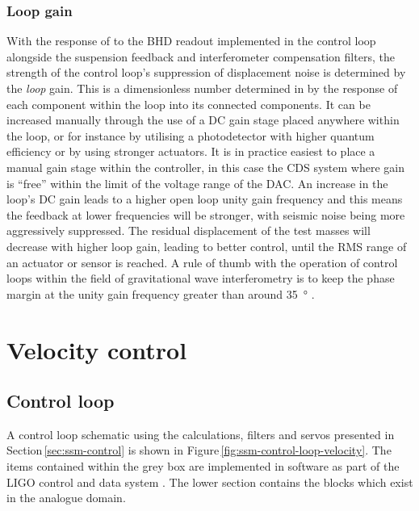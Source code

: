 \subsubsection{Loop gain}
With the response of \LMINUS{} to the \gls{BHD} readout implemented in the control loop alongside the suspension feedback and interferometer compensation filters, the strength of the control loop's suppression of displacement noise is determined by the \emph{loop} gain. This is a dimensionless number determined in by the response of each component within the loop into its connected components. It can be increased manually through the use of a \gls{DC} gain stage placed anywhere within the loop, or for instance by utilising a photodetector with higher quantum efficiency or by using stronger actuators. It is in practice easiest to place a manual gain stage within the controller, in this case the \gls{CDS} system where gain is ``free'' within the limit of the voltage range of the \gls{DAC}. An increase in the loop's \gls{DC} gain leads to a higher open loop unity gain frequency and this means the feedback at lower frequencies will be stronger, with seismic noise being more aggressively suppressed. The residual displacement of the test masses will decrease with higher loop gain, leading to better control, until the \gls{RMS} range of an actuator or sensor is reached. A rule of thumb with the operation of control loops within the field of gravitational wave interferometry is to keep the phase margin at the unity gain frequency greater than around \SI{35}{\degree} \cite{Freise2003}.

\section{Velocity control}

\subsection{Control loop}

A control loop schematic using the calculations, filters and servos presented in Section\,\ref{sec:ssm-control} is shown in Figure\,\ref{fig:ssm-control-loop-velocity}. The items contained within the grey box are implemented in software as part of the LIGO control and data system \cite{Bork2010}. The lower section contains the blocks which exist in the analogue domain.

